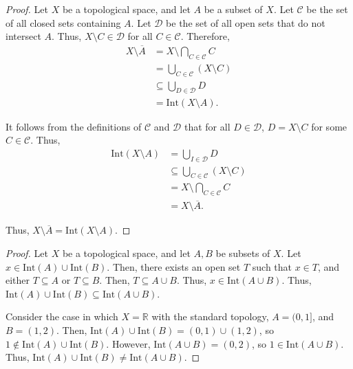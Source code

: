 \documentclass{article}
\newcommand{\R}{\mathbb R}
\begin{document}
\newpage{}
\begin{proof}
    Let $X$ be a topological space, and let $A$ be a subset of $X$.
    Let $\mathcal C$ be the set of all closed sets containing $A$.
    Let $\mathcal D$ be the set of all open sets that do not intersect $A$.
    Thus, $X \setminus C \in \mathcal D$ for all $C \in \mathcal C$.
    Therefore,
    \begin{align*}
        X \setminus \overline A &= X \setminus \bigcap_{C \in \mathcal C} C \\
                                &= \bigcup_{C \in \mathcal C} (X \setminus C) \\
                                &\subseteq \bigcup_{D \in \mathcal D} D \\
                                &= \text{Int}(X \setminus A).
    \end{align*}

    It follows from the definitions of $\mathcal C$ and $\mathcal D$ that for all $D \in \mathcal D$, $D = X \setminus C$ for some $C \in \mathcal C$.
    Thus,
    \begin{align*}
        \text{Int}(X \setminus A) &= \bigcup_{I \in \mathcal D} D \\
                                  &\subseteq \bigcup_{C \in \mathcal C} (X \setminus C) \\
                                  &= X \setminus \bigcap_{C \in \mathcal C} C \\
                                  &= X \setminus \overline A.
    \end{align*}

    Thus, $X \setminus \overline A = \text{Int}(X \setminus A)$.
    \end{proof}

\newpage{}
\begin{proof}
    Let $X$ be a topological space, and let $A,B$ be subsets of $X$.
    Let $x \in \text{Int}(A) \cup \text{Int}(B)$.
    Then, there exists an open set $T$ such that $x \in T$, and either $T \subseteq A$ or $T \subseteq B$.
    Then, $T \subseteq A \cup B$.
    Thus, $x \in \text{Int}(A \cup B)$.
    Thus, $\text{Int}(A) \cup \text{Int}(B) \subseteq \text{Int}(A \cup B)$.

    Consider the case in which $X=\R$ with the standard topology, $A=(0,1]$, and $B=(1,2)$.
    Then, $\text{Int}(A) \cup \text{Int}(B) = (0,1) \cup (1,2)$, so $1 \notin \text{Int}(A) \cup \text{Int}(B)$.
    However, $\text{Int}(A \cup B) = (0,2)$, so $1 \in \text{Int}(A \cup B)$.
    Thus, $\text{Int}(A) \cup \text{Int}(B) \neq \text{Int}(A \cup B)$.
\end{proof}
\end{document}
